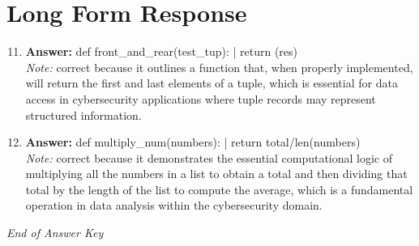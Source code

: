 \documentclass[12pt]{article}
\begin{document}
\section*{Long Form Response}
\begin{enumerate}[label=\arabic*.]
\setcounter{enumi}{10}
\item \textbf{Answer:} def front\_and\_rear(test\_tup): | return (res)
\\ \textit{Note:} correct because it outlines a function that, when properly implemented, will return the first and last elements of a tuple, which is essential for data access in cybersecurity applications where tuple records may represent structured information.
\item \textbf{Answer:} def multiply\_num(numbers): | return total/len(numbers)
\\ \textit{Note:} correct because it demonstrates the essential computational logic of multiplying all the numbers in a list to obtain a total and then dividing that total by the length of the list to compute the average, which is a fundamental operation in data analysis within the cybersecurity domain.
\end{enumerate}

\vfill
\noindent\textit{End of Answer Key}
\end{document}
